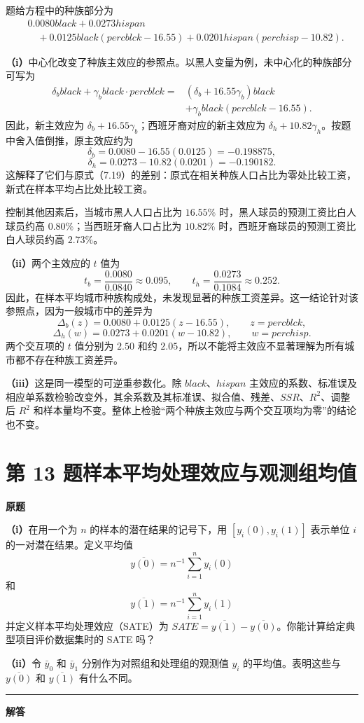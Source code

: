 \documentclass[UTF8,a4paper,11pt,fontset=fandol]{ctexart}
\newcommand{\vr}[1]{\mathit{#1}}
\newcommand{\subq}[1]{\par\medskip\noindent\textbf{（#1）}\enspace}
\newcommand{\question}[2]{\def\currentquestiontitle{第 #1 题\quad #2}}
\newenvironment{originalquestion}{%
  \par\medskip\noindent\begin{minipage}{\linewidth}
  \section*{\currentquestiontitle}
  \par\smallskip\noindent\textbf{原题}\par\smallskip
  \begingroup\small\setlength{\parskip}{2.5pt}%
}{%
  \par\endgroup\end{minipage}\par\medskip\Needspace{6\baselineskip}
  \noindent\rule{\linewidth}{0.35pt}\par\smallskip
  \noindent\textbf{解答}\par
}
\begin{document}
题给方程中的种族部分为
\[
\begin{aligned}
&0.0080\vr{black}+0.0273\vr{hispan}\\
&\quad+0.0125\vr{black}(\vr{percblck}-16.55)
+0.0201\vr{hispan}(\vr{perchisp}-10.82).
\end{aligned}
\]
\subq{i}中心化改变了种族主效应的参照点。以黑人变量为例，未中心化的种族部分可写为
\[
\begin{aligned}
\delta_b\vr{black}+\gamma_b\vr{black}\cdot\vr{percblck}
={}&(\delta_b+16.55\gamma_b)\vr{black}\\
&+\gamma_b\vr{black}(\vr{percblck}-16.55).
\end{aligned}
\]
因此，新主效应为 $\delta_b+16.55\gamma_b$；西班牙裔对应的新主效应为 $\delta_h+10.82\gamma_h$。按题中舍入值倒推，原主效应约为
\[
\delta_b=0.0080-16.55(0.0125)=-0.198875,
\]
\[
\delta_h=0.0273-10.82(0.0201)=-0.190182.
\]
这解释了它们与原式（7.19）的差别：原式在相关种族人口占比为零处比较工资，新式在样本平均占比处比较工资。

控制其他因素后，当城市黑人人口占比为 $16.55\%$ 时，黑人球员的预测工资比白人球员约高 $0.80\%$；当西班牙裔人口占比为 $10.82\%$ 时，西班牙裔球员的预测工资比白人球员约高 $2.73\%$。

\subq{ii}两个主效应的 $t$ 值为
\[
t_b=\frac{0.0080}{0.0840}\approx0.095,\qquad
t_h=\frac{0.0273}{0.1084}\approx0.252.
\]
因此，在样本平均城市种族构成处，未发现显著的种族工资差异。这一结论针对该参照点，因为一般城市中的差异为
\[
\Delta_b(z)=0.0080+0.0125(z-16.55),\qquad z=\vr{percblck},
\]
\[
\Delta_h(w)=0.0273+0.0201(w-10.82),\qquad w=\vr{perchisp}.
\]
两个交互项的 $t$ 值分别为 $2.50$ 和约 $2.05$，所以不能将主效应不显著理解为所有城市都不存在种族工资差异。

\subq{iii}这是同一模型的可逆重参数化。除 $\vr{black}$、$\vr{hispan}$ 主效应的系数、标准误及相应单系数检验改变外，其余系数及其标准误、拟合值、残差、$SSR$、$R^2$、调整后 $R^2$ 和样本量均不变。整体上检验“两个种族主效应与两个交互项均为零”的结论也不变。

\question{13}{样本平均处理效应与观测组均值}
\begin{originalquestion}
\subq{i}在用一个为 $n$ 的样本的潜在结果的记号下，用 $[y_i(0),y_i(1)]$ 表示单位 $i$ 的一对潜在结果。定义平均值
\[
\overline{y(0)}=n^{-1}\sum_{i=1}^n y_i(0)
\]
和
\[
\overline{y(1)}=n^{-1}\sum_{i=1}^n y_i(1)
\]
并定义样本平均处理效应（SATE）为 $SATE=\overline{y(1)}-\overline{y(0)}$。你能计算给定典型项目评价数据集时的 SATE 吗？

\subq{ii}令 $\bar y_0$ 和 $\bar y_1$ 分别作为对照组和处理组的观测值 $y_i$ 的平均值。表明这些与 $\overline{y(0)}$ 和 $\overline{y(1)}$ 有什么不同。
\end{originalquestion}
\end{document}
